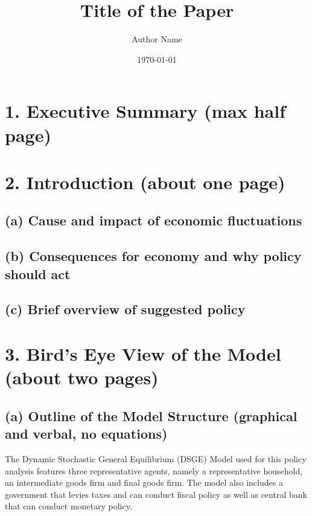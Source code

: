 \documentclass[12pt]{article}
\title{Title of the Paper}
\author{Author Name}
\date{\today}
\begin{document}
\maketitle
\section*{1. Executive Summary (max half page)}

\section*{2. Introduction (about one page)}
\subsection*{(a) Cause and impact of economic fluctuations}

\subsection*{(b) Consequences for economy and why policy should act}

\subsection*{(c) Brief overview of suggested policy}



\newpage
\section*{3. Bird’s Eye View of the Model (about two pages)}



\subsection*{(a) Outline of the Model Structure (graphical and verbal, no equations)}
The Dynamic Stochastic General Equilibrium (DSGE) Model used for this policy analysis features
three representative agents, namely a representative household, an intermediate goods firm and final goods firm. The model also includes a government that levies taxes and can conduct fiscal policy as well as central bank that can conduct monetary policy. 
\end{document}
